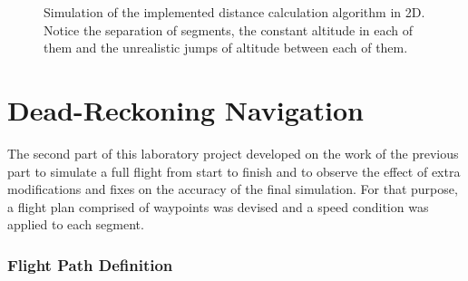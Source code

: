 \documentclass{article}
\begin{document}
\begin{figure}[ht]
    \centering
    \caption{Simulation of the implemented distance calculation algorithm in 2D. Notice the separation of segments, the constant altitude in each of them and the unrealistic jumps of altitude between each of them.}
    \label{tikz:consth_error}
\end{figure}

\part{Dead-Reckoning Navigation}

The second part of this laboratory project developed on the work of the previous part to simulate a full flight from start to finish and to observe the effect of extra modifications and fixes on the accuracy of the final simulation. For that purpose, a flight plan comprised of waypoints was devised and a speed condition was applied to each segment.

\section{Flight Path Definition}
\end{document}
